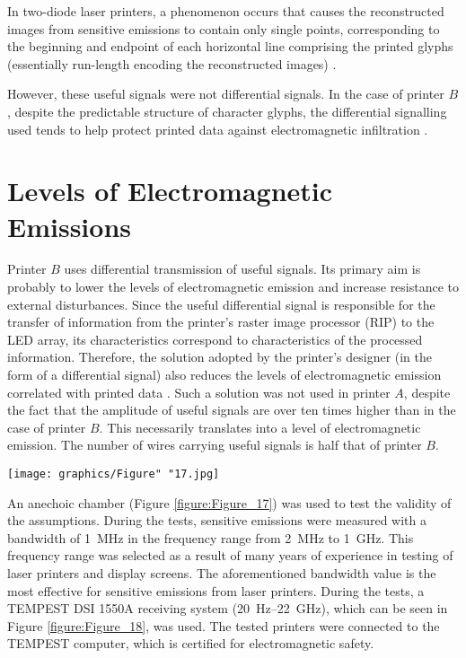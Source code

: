 \documentclass[letterpaper,journal]{ieeetran}
\begin{document}
In two-diode laser printers, a phenomenon occurs that causes the
reconstructed images from sensitive emissions to contain only single points,
corresponding to the beginning and endpoint of each horizontal line
comprising the printed glyphs (essentially run-length encoding
the reconstructed images) \cite{Kubiak2014d}.

However, these useful signals were not differential signals. In the case of
printer $B$, despite the predictable structure of character glyphs, the
differential signalling used tends to help protect printed data against
electromagnetic infiltration \cite{Ketenci2017a}.

\section{Levels of Electromagnetic Emissions}

Printer $B$ uses differential transmission of useful signals. Its primary aim
is probably to lower the levels of electromagnetic emission and increase
resistance to external disturbances. Since the useful differential signal is
responsible for the transfer of information from the printer's raster image
processor (RIP) to the LED array, its characteristics correspond to
characteristics of the processed information. Therefore, the solution adopted
by the printer's designer (in the form of a differential signal) also reduces
the levels of electromagnetic emission correlated with printed data
\cite{Song2015a}. Such a solution was not used in printer $A$, despite the
fact that the amplitude of useful signals are over ten times higher than in
the case of printer $B$. This necessarily translates into a level of
electromagnetic emission. The number of wires carrying useful signals is half
that of printer $B$.

\begin{figure*}[ht]
    \centering
    \texttt{[image: graphics/Figure" "17.jpg]}
    \caption{Anechoic chamber where the tests were carried out.}
    \label{figure:Figure_17}
\end{figure*}

An anechoic chamber (Figure \ref{figure:Figure_17}) was used to test the
validity of the assumptions.
During the tests, sensitive emissions were measured with a bandwidth of
\SI{1}{\mega\hertz} in the frequency range from \SI{2}{\mega\hertz} to
\SI{1}{\giga\hertz}. This frequency range was selected as a result of many
years of experience in testing of laser printers and display screens. The
aforementioned bandwidth value is the most effective for sensitive emissions
from laser printers. During the tests, a TEMPEST DSI 1550A receiving system
(\SI{20}{\hertz}--\SI{22}{\giga\hertz}), which can be seen in Figure
\ref{figure:Figure_18}, was used. The tested printers were connected to the
TEMPEST computer, which is certified for electromagnetic safety.
\end{document}
